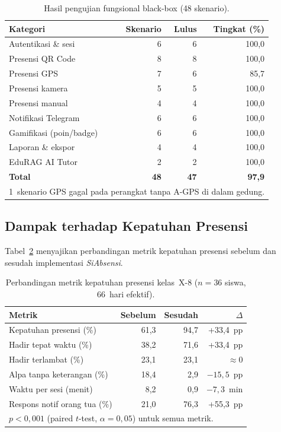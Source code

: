 \documentclass[12pt,a4paper]{article}
\newcommand{\edurag}{EduRAG}
\newcommand{\sistem}{\textit{SiAbsensi}}
\begin{document}
\begin{table}[htbp]
\centering
\caption{Hasil pengujian fungsional black-box (48 skenario).}
\label{tab:blackbox}
\small
\renewcommand{\arraystretch}{1.15}
\begin{tabular}{lrrr}
\toprule
\textbf{Kategori} & \textbf{Skenario} &
  \textbf{Lulus} & \textbf{Tingkat (\%)} \\
\midrule
Autentikasi \& sesi    &  6 &  6 & 100,0 \\
Presensi QR Code       &  8 &  8 & 100,0 \\
Presensi GPS           &  7 &  6 &  85,7 \\
Presensi kamera        &  5 &  5 & 100,0 \\
Presensi manual        &  4 &  4 & 100,0 \\
Notifikasi Telegram    &  6 &  6 & 100,0 \\
Gamifikasi (poin/badge)&  6 &  6 & 100,0 \\
Laporan \& ekspor      &  4 &  4 & 100,0 \\
\edurag{} AI Tutor     &  2 &  2 & 100,0 \\
\midrule
\textbf{Total}         & \textbf{48} & \textbf{47} & \textbf{97,9} \\
\bottomrule
\multicolumn{4}{l}{\footnotesize 1~skenario GPS gagal pada perangkat
  tanpa A-GPS di dalam gedung.}
\end{tabular}
\end{table}

\subsection{Dampak terhadap Kepatuhan Presensi}

Tabel~\ref{tab:kepatuhan} menyajikan perbandingan metrik kepatuhan
presensi sebelum dan sesudah implementasi \sistem{}.

\begin{table}[htbp]
\centering
\caption{Perbandingan metrik kepatuhan presensi kelas~X-8
         ($n=36$ siswa, 66~hari efektif).}
\label{tab:kepatuhan}
\small
\renewcommand{\arraystretch}{1.15}
\begin{tabular}{lrrr}
\toprule
\textbf{Metrik} &
  \textbf{Sebelum} &
  \textbf{Sesudah} &
  \textbf{$\Delta$} \\
\midrule
Kepatuhan presensi (\%) & 61,3 & 94,7 & +33,4~pp \\
Hadir tepat waktu (\%)  & 38,2 & 71,6 & +33,4~pp \\
Hadir terlambat (\%)    & 23,1 & 23,1 & $\approx 0$ \\
Alpa tanpa keterangan (\%) & 18,4 & 2,9 & $-15,5$~pp \\
Waktu per sesi (menit)  & 8,2  & 0,9  & $-7,3$~min \\
Respons notif orang tua (\%) & 21,0 & 76,3 & +55,3~pp \\
\midrule
\multicolumn{4}{l}{\footnotesize $p < 0{,}001$ (paired $t$-test,
  $\alpha = 0{,}05$) untuk semua metrik.}
\end{tabular}
\end{table}
\end{document}
